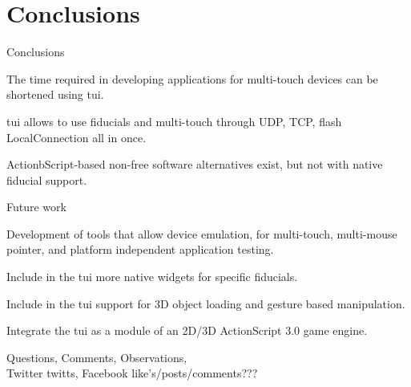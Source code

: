 \section{Conclusions}
\begin{frame}%
\begin{block}{Conclusions}
\begin{itemize}
\begin{minipage}{.9\linewidth} 
\item The time required in developing applications for multi-touch devices can be shortened using tui.\\
\item tui allows to use fiducials and multi-touch through UDP, TCP, flash LocalConnection all in once. \\
\item ActionbScript-based non-free software alternatives exist, but not with native fiducial support. 
\end{minipage}
\end{itemize}
\end{block}
\end{frame}

\begin{frame}%
\begin{block}{Future work}
\begin{itemize}
\begin{minipage}{.9\linewidth} 
\item Development of tools that allow device emulation, for multi-touch, multi-mouse pointer, and platform independent application testing.\\
\item Include in the tui more native widgets for specific fiducials.\\
\item Include in the tui support for 3D object loading and gesture based manipulation.\\
\item Integrate the tui as a module of an 2D/3D ActionScript 3.0 game engine.
\end{minipage}
\end{itemize}
\end{block}
\end{frame}

\begin{frame}%
\begin{block}{}
\begin{center}
Questions, Comments, Observations, \\
Twitter twitts, Facebook like's/posts/comments???
\end{center}
\end{block}
\end{frame}